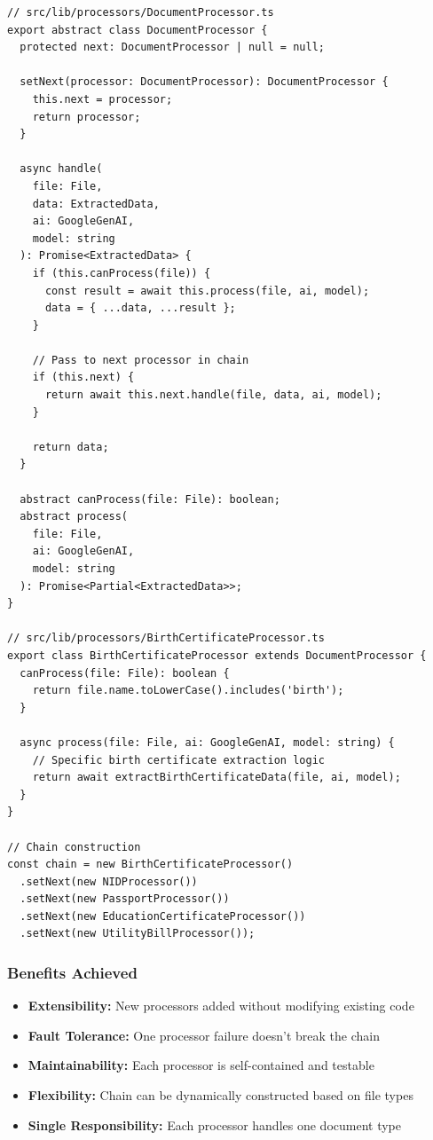 \documentclass[11pt, a4paper]{article}
\theoremstyle{plain}
\theoremstyle{definition}
\begin{document}
\begin{lstlisting}[caption={Chain of Responsibility Implementation}]
// src/lib/processors/DocumentProcessor.ts
export abstract class DocumentProcessor {
  protected next: DocumentProcessor | null = null;
  
  setNext(processor: DocumentProcessor): DocumentProcessor {
    this.next = processor;
    return processor;
  }
  
  async handle(
    file: File,
    data: ExtractedData,
    ai: GoogleGenAI,
    model: string
  ): Promise<ExtractedData> {
    if (this.canProcess(file)) {
      const result = await this.process(file, ai, model);
      data = { ...data, ...result };
    }
    
    // Pass to next processor in chain
    if (this.next) {
      return await this.next.handle(file, data, ai, model);
    }
    
    return data;
  }
  
  abstract canProcess(file: File): boolean;
  abstract process(
    file: File, 
    ai: GoogleGenAI, 
    model: string
  ): Promise<Partial<ExtractedData>>;
}

// src/lib/processors/BirthCertificateProcessor.ts
export class BirthCertificateProcessor extends DocumentProcessor {
  canProcess(file: File): boolean {
    return file.name.toLowerCase().includes('birth');
  }
  
  async process(file: File, ai: GoogleGenAI, model: string) {
    // Specific birth certificate extraction logic
    return await extractBirthCertificateData(file, ai, model);
  }
}

// Chain construction
const chain = new BirthCertificateProcessor()
  .setNext(new NIDProcessor())
  .setNext(new PassportProcessor())
  .setNext(new EducationCertificateProcessor())
  .setNext(new UtilityBillProcessor());
\end{lstlisting}

\subsubsection{Benefits Achieved}

\begin{itemize}
    \item \textbf{Extensibility:} New processors added without modifying existing code
    \item \textbf{Fault Tolerance:} One processor failure doesn't break the chain
    \item \textbf{Maintainability:} Each processor is self-contained and testable
    \item \textbf{Flexibility:} Chain can be dynamically constructed based on file types
    \item \textbf{Single Responsibility:} Each processor handles one document type
\end{itemize}
\end{document}
